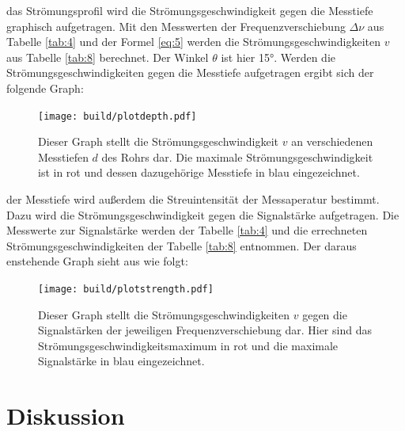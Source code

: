     \justifying das Strömungsprofil wird die Strömungsgeschwindigkeit gegen die Messtiefe graphisch aufgetragen. Mit den Messwerten der Frequenzverschiebung
    $\Delta\nu$ aus Tabelle \ref{tab:4} und der Formel \eqref{eq:5} werden die Strömungsgeschwindigkeiten $v$ aus Tabelle \ref{tab:8} berechnet. Der Winkel $\theta$ ist hier
    15°. Werden die Strömungsgeschwindigkeiten gegen die Messtiefe aufgetragen ergibt sich der folgende Graph:

\begin{figure}[H]
    \centering
    \texttt{[image: build/plotdepth.pdf]}
    \caption{Dieser Graph stellt die Strömungsgeschwindigkeit $v$ an verschiedenen Messtiefen $d$ des Rohrs dar. Die maximale Strömungsgeschwindigkeit ist in rot und dessen dazugehörige
    Messtiefe in blau eingezeichnet.}
    \label{fig:8}
\end{figure}

\newpage
    \justifying der Messtiefe wird außerdem die Streuintensität der Messaperatur bestimmt. Dazu wird die Strömungsgeschwindigkeit gegen die Signalstärke aufgetragen.
    Die Messwerte zur Signalstärke werden der Tabelle \ref{tab:4} und die errechneten Strömungsgeschwindigkeiten der Tabelle \ref{tab:8} entnommen. Der daraus enstehende Graph
    sieht aus wie folgt:

\begin{figure}[H]
    \centering
    \texttt{[image: build/plotstrength.pdf]}
    \caption{Dieser Graph stellt die Strömungsgeschwindigkeiten $v$ gegen die Signalstärken der jeweiligen Frequenzverschiebung dar. Hier sind das Strömungsgeschwindigkeitsmaximum
    in rot und die maximale Signalstärke in blau eingezeichnet.}
    \label{fig:9}
\end{figure}

\newpage
\section{Diskussion}

